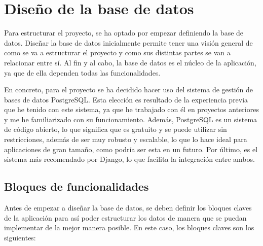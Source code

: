 \section{Diseño de la base de datos}
\label{dev:sec:diseno_base_datos}

Para estructurar el proyecto, se ha optado por empezar definiendo la base de datos. Diseñar la base de datos inicialmente permite tener una visión general de como se va a estructurar el proyecto y como sus distintas partes se van a relacionar entre sí. Al fin y al cabo, la base de datos es el núcleo de la aplicación, ya que de ella dependen todas las funcionalidades.

En concreto, para el proyecto se ha decidido hacer uso del sistema de gestión de bases de datos PostgreSQL. Esta elección es resultado de la experiencia previa que he tenido con este sistema, ya que he trabajado con él en proyectos anteriores y me he familiarizado con su funcionamiento. Además, PostgreSQL es un sistema de código abierto, lo que significa que es gratuito y se puede utilizar sin restricciones, además de ser muy robusto y escalable, lo que lo hace ideal para aplicaciones de gran tamaño, como podría ser esta en un futuro. Por último, es el sistema más recomendado por Django, lo que facilita la integración entre ambos.

\subsection{Bloques de funcionalidades}
\label{dev:subsec:bloques_funcionalidades}

Antes de empezar a diseñar la base de datos, se deben definir los bloques claves de la aplicación para así poder estructurar los datos de manera que se puedan implementar de la mejor manera posible. En este caso, los bloques claves son los siguientes:

